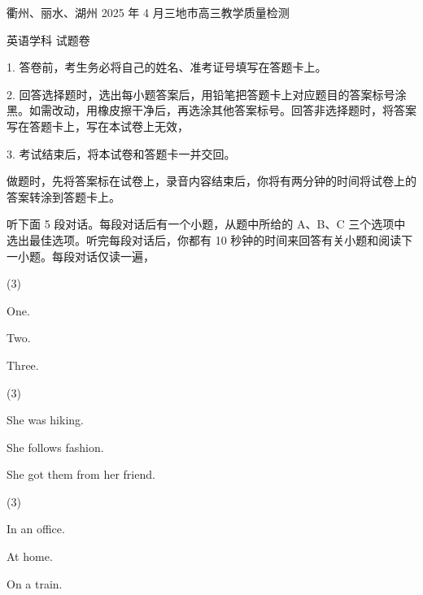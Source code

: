 \documentclass{英语试卷}
\begin{document}
\par 衢州、丽水、湖州 2025 年 4 月三地市高三教学质量检测\par
\par 英语学科 试题卷\par
\begin{notice}
\par 1. 答卷前，考生务必将自己的姓名、准考证号填写在答题卡上。\par
\par 2. 回答选择题时，选出每小题答案后，用铅笔把答题卡上对应题目的答案标号涂黑。如需改动，用橡皮擦干净后，再选涂其他答案标号。回答非选择题时，将答案写在答题卡上，写在本试卷上无效，\par
\par 3. 考试结束后，将本试卷和答题卡一并交回。\par
\end{notice}
\par 做题时，先将答案标在试卷上，录音内容结束后，你将有两分钟的时间将试卷上的答案转涂到答题卡上。\par
{}
\par 听下面 5 段对话。每段对话后有一个小题，从题中所给的 A、B、C 三个选项中选出最佳选项。听完每段对话后，你都有 10 秒钟的时间来回答有关小题和阅读下一小题。每段对话仅读一遍，\par
{}
\begin{choices}(3)
  \item One.
  \item Two.
  \item Three.
\end{choices}
\begin{choices}(3)
  \item She was hiking.
  \item She follows fashion.
  \item She got them from her friend.
\end{choices}
\begin{choices}(3)
  \item In an office.
  \item At home.
  \item On a train.
\end{choices}
\end{document}
